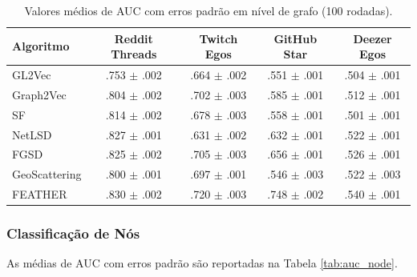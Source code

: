 \documentclass[sigconf]{acmart}
\begin{document}
\begin{table}[h]
\centering
\caption{Valores médios de AUC com erros padrão em nível de grafo (100 rodadas).}
\label{tab:auc_graph}
\small
\begin{tabular}{lcccc}
\toprule
Algoritmo & Reddit Threads & Twitch Egos & GitHub Star & Deezer Egos \\
\midrule
GL2Vec & .753 $\pm$ .002 & .664 $\pm$ .002 & .551 $\pm$ .001 & .504 $\pm$ .001 \\
Graph2Vec & .804 $\pm$ .002 & .702 $\pm$ .003 & .585 $\pm$ .001 & .512 $\pm$ .001 \\
SF & .814 $\pm$ .002 & .678 $\pm$ .003 & .558 $\pm$ .001 & .501 $\pm$ .001 \\
NetLSD & .827 $\pm$ .001 & .631 $\pm$ .002 & .632 $\pm$ .001 & .522 $\pm$ .001 \\
FGSD & .825 $\pm$ .002 & .705 $\pm$ .003 & .656 $\pm$ .001 & .526 $\pm$ .001 \\
GeoScattering & .800 $\pm$ .001 & .697 $\pm$ .001 & .546 $\pm$ .003 & .522 $\pm$ .003 \\
FEATHER & .830 $\pm$ .002 & .720 $\pm$ .003 & .748 $\pm$ .002 & .540 $\pm$ .001 \\
\bottomrule
\end{tabular}
\end{table}

\subsubsection{Classificação de Nós}

As médias de AUC com erros padrão são reportadas na Tabela \ref{tab:auc_node}.
\end{document}
